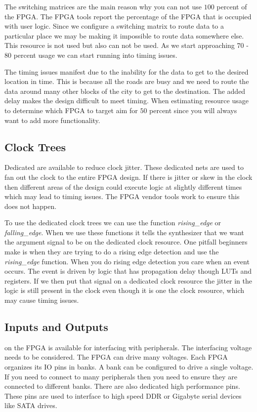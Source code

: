 The switching matrices are the main reason why you can not use $100$ percent of the \ac{FPGA}. The \ac{FPGA} tools report the percentage of the \ac{FPGA} that is occupied with user logic. Since we configure a switching matrix to route data to a particular place we may be making it impossible to route data somewhere else. This resource is not used but also can not be used. As we start approaching $70$ - $80$ percent usage we can start running into timing issues.

The timing issues manifest due to the inability for the data to get to the desired location in time. This is because all the roads are busy and we need to route the data around many other blocks of the city to get to the destination. The added delay makes the design difficult to meet timing. When estimating resource usage to determine which \ac{FPGA} to target aim for $50$ percent since you will always want to add more functionality.
	
\subsection{Clock Trees}

Dedicated  are available to reduce clock jitter. These dedicated nets are used to fan out the clock to the entire \ac{FPGA} design. If there is jitter or skew in the clock then different areas of the design could execute logic at slightly different times which may lead to timing issues. The \ac{FPGA} vendor tools work to ensure this does not happen.

To use the dedicated clock trees we can use the function \emph{rising\_edge} or \emph{falling\_edge}. When we use these functions it tells the synthesizer that we want the argument signal to be on the dedicated clock resource. One pitfall beginners make is when they are trying to do a rising edge detection and use the \emph{rising\_edge} function. When you do rising edge detection you care when an event occurs. The event is driven by logic that has propagation delay though \ac{LUT}s and registers. If we then put that signal on a dedicated clock resource the jitter in the logic is still present in the clock even though it is one the clock resource, which may cause timing issues. 

\subsection{Inputs and Outputs}

 on the \ac{FPGA} is available for interfacing with peripherals. The interfacing voltage needs to be considered. The \ac{FPGA} can drive many voltages. Each \ac{FPGA} organizes its \ac{IO} pins in banks. A bank can be configured to drive a single voltage. If you need to connect to many peripherals then you need to ensure they are connected to different banks. There are also dedicated high performance pins. These pins are used to interface to high speed \ac{DDR} or Gigabyte serial devices like \ac{SATA} drives. 